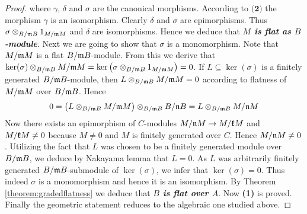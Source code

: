 \begin{proof}
where $\gamma$, $\delta$ and $\sigma$ are the canonical morphisms. According to $\textbf{(2)}$ the morphism $\gamma$ is an isomorphism. Clearly $\delta$ and $\sigma$ are epimorphisms. Thus $\sigma \otimes_{B/\mathfrak{m}B}1_{M/\mathfrak{m}M}$ and $\delta$ are isomorphisms. Hence we deduce that \textit{\textbf{$M$ is flat as $B$-module}}. Next we are going to show that $\sigma$ is a monomorphism. Note  that $M/\mathfrak{m}M$ is a flat $B/\mathfrak{m}B$-module. From this we derive that $\mathrm{ker}(\sigma)\otimes_{B/\mathfrak{m}B}M/\mathfrak{m}M=
\ker\left(\sigma \otimes_{B/\mathfrak{m}B}1_{M/\mathfrak{m}M}\right)=0$. If $L\subseteq \ker(\sigma)$ is a finitely generated $B/\mathfrak{m}B$-module, then $L\otimes_{B/\mathfrak{m}B}M/\mathfrak{m}M=0$ according to flatness of $M/\mathfrak{m}M$ over $B/\mathfrak{m}B$. Hence 
$$0=\left(L\otimes_{B/\mathfrak{m}B}M/\mathfrak{m}M\right)\otimes_{B/\mathfrak{m}B}B/\mathfrak{n}B= L\otimes_{B/\mathfrak{m}B}M/\mathfrak{n}M$$
Now there exists an epimorphism of $C$-modules $M/\mathfrak{n}M\rightarrow M/\mathfrak{k}M$ and $M/\mathfrak{k}M\neq 0$ because $M\neq 0$ and $M$ is finitely generated over $C$. Hence $M/\mathfrak{n}M\neq 0$. Utilizing the fact that $L$ was chosen to be a finitely generated module over $B/\mathfrak{m}B$, we deduce by Nakayama lemma that $L=0$. As $L$ was arbitrarily finitely generated $B/\mathfrak{m}B$-submodule of $\ker(\sigma)$, we infer that $\ker(\sigma)=0$.
Thus indeed $\sigma$ is a monomorphism and hence it is an isomorphism. By Theorem \ref{theorem:gradedflatness} we deduce that \textit{\textbf{$B$ is flat over $A$}}. Now \textbf{(1)} is proved.\\
Finally the geometric statement reduces to the algebraic one studied above.
\end{proof}












\small



